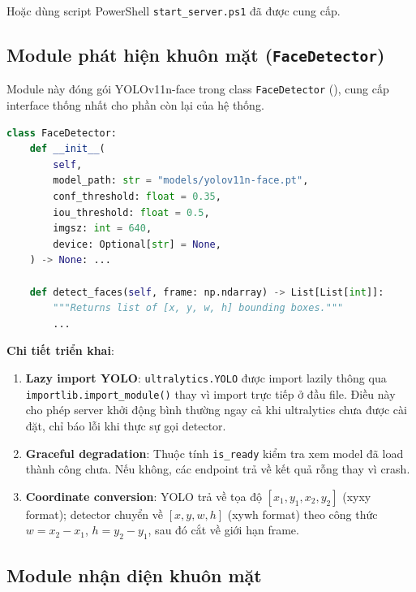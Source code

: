 Hoặc dùng script PowerShell \texttt{start\_server.ps1} đã được cung cấp.

\subsection{Module phát hiện khuôn mặt (\texttt{FaceDetector})}
\label{subsec:detectormod}

Module này đóng gói YOLOv11n-face trong class \texttt{FaceDetector} (), cung cấp interface thống nhất cho phần còn lại của hệ thống.

\begin{lstlisting}[language=Python, caption={Interface của FaceDetector}]
class FaceDetector:
    def __init__(
        self,
        model_path: str = "models/yolov11n-face.pt",
        conf_threshold: float = 0.35,
        iou_threshold: float = 0.5,
        imgsz: int = 640,
        device: Optional[str] = None,
    ) -> None: ...

    def detect_faces(self, frame: np.ndarray) -> List[List[int]]:
        """Returns list of [x, y, w, h] bounding boxes."""
        ...
\end{lstlisting}

\medskip
\textbf{Chi tiết triển khai}:

\begin{enumerate}[1.]
    \item \textbf{Lazy import YOLO}: \texttt{ultralytics.YOLO} được import lazily thông qua \texttt{importlib.import\_module()} thay vì import trực tiếp ở đầu file. Điều này cho phép server khởi động bình thường ngay cả khi ultralytics chưa được cài đặt, chỉ báo lỗi khi thực sự gọi detector.
    
    \item \textbf{Graceful degradation}: Thuộc tính \texttt{is\_ready} kiểm tra xem model đã load thành công chưa. Nếu không, các endpoint trả về kết quả rỗng thay vì crash.
    
    \item \textbf{Coordinate conversion}: YOLO trả về tọa độ $[x_1, y_1, x_2, y_2]$ (xyxy format); detector chuyển về $[x, y, w, h]$ (xywh format) theo công thức $w = x_2 - x_1$, $h = y_2 - y_1$, sau đó cắt về giới hạn frame.
\end{enumerate}

\subsection{Module nhận diện khuôn mặt}
\label{subsec:recognizermod}


